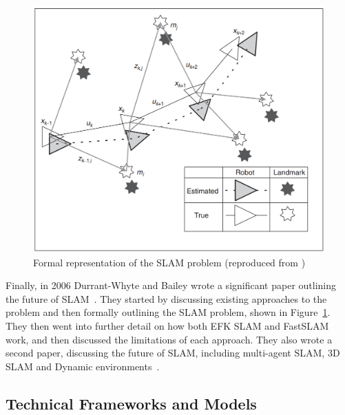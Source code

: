 \documentclass[12pt]{article}
\begin{document}
\begin{figure}[h]
    \centering
    \begin{minipage}{0.8\textwidth}
        \centering
        \includegraphics[width=\linewidth]{SLAM_problem} %
        \caption[Short caption]{Formal representation of the SLAM problem (reproduced from \cite{SLAM_summary})}
        \label{fig:SLAM_problem}
    \end{minipage}\hfill
\end{figure}

Finally, in 2006 Durrant-Whyte and Bailey wrote a significant paper outlining the future of SLAM~\cite{SLAM_summary}.
They started by discussing existing approaches to the problem and then formally outlining the SLAM problem, shown in Figure~\ref{fig:SLAM_problem}.
They then went into further detail on how both EFK SLAM and FastSLAM work, and then discussed the limitations of each approach.
They also wrote a second paper, discussing the future of SLAM, including multi-agent SLAM, 3D SLAM and Dynamic environments~\cite{Further_SLAM}.

\subsection{Technical Frameworks and Models} %
\end{document}
